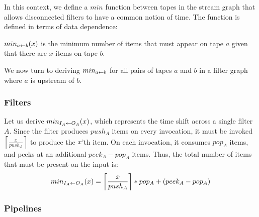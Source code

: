 In this context, we define a $min$ function between tapes in the
stream graph that allows disconnected filters to have a common notion
of time.  The function is defined in terms of data dependence:
\begin{definition}
$min_{a \leftarrow b}(x)$ is the minimum number of items that must appear on tape
$a$ given that there are $x$ items on tape $b$.
\end{definition}
We now turn to deriving $min_{a \leftarrow b}$ for all pairs of tapes $a$ and $b$
in a filter graph where $a$ is upstream of $b$.

\subsubsection{Filters}

Let us derive $min_{I_A \leftarrow O_A}(x)$, which represents the time shift
across a single filter $A$.  Since the filter produces $push_A$ items
on every invocation, it must be invoked
$\left\lceil\frac{x}{push_A}\right\rceil$ to produce the $x$'th item.
On each invocation, it consumes $pop_A$ items, and peeks at an
additional $peek_A-pop_A$ items.  Thus, the total number of items that
must be present on the input is:
\begin{align}
\label{eq:minfilter}
min_{I_A \leftarrow O_A}(x) = \left\lceil\frac{x}{push_A}\right\rceil*pop_A+(peek_A-pop_A)
\end{align}

\subsubsection{Pipelines}
\label{sec:timepipe}

